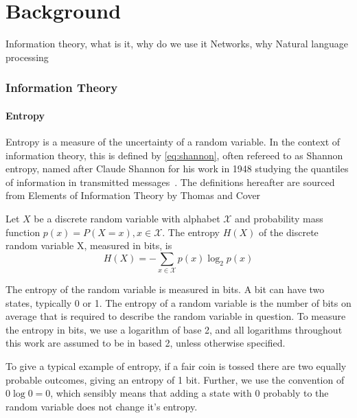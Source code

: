 \chapter{Background \label{ch:background}}

Information theory, what is it, why do we use it
Networks, why
Natural language processing


\subsection{Information Theory}

\subsubsection{Entropy}
Entropy is a measure of the uncertainty of a random variable. In the context of information theory, this is defined by \autoref{eq:shannon}, often refereed to as Shannon entropy, named after Claude Shannon for his work in 1948 studying the quantiles of information in transmitted messages~. The definitions hereafter are sourced from Elements of Information Theory by Thomas and Cover  

\begin{definition}
	Let $X$ be a discrete random variable with alphabet $\mathcal{X}$ and probability mass function $p(x) = P(X = x), x \in \mathcal{X}$.
	The entropy $H(X)$ of the discrete random variable X, measured in bits, is 
	\begin{equation}\label{eq:shannon}
	H(X)=-\sum_{x \in \mathcal{X}} p(x) \log_2 p(x)
	\end{equation}
\end{definition} 

The entropy of the random variable is measured in bits. A bit can have two states, typically 0 or 1. The entropy of a random variable is the number of bits on average that is required to describe the random variable in question. To measure the entropy in bits, we use a logarithm of base 2, and all logarithms throughout this work are assumed to be in based 2, unless otherwise specified.

To give a typical example of entropy, if a fair coin is tossed there are two equally probable outcomes, giving an entropy of 1 bit. Further, we use the convention of $0\log 0 = 0$, which sensibly means that adding a state with 0 probably to the random variable does not change it's entropy.

